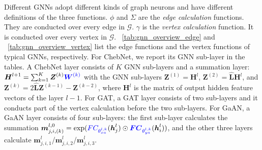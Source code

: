 Different GNNs adopt different kinds of graph neurons and have different definitions of the three functions.
$\phi$ and $\Sigma$ are the \emph{edge calculation} functions.
They are conducted over every edge in $\mathcal{G}$.
$\gamma$ is the \emph{vertex calculation} function.
It is conducted over every vertex in $\mathcal{G}$.
\tablename~\ref{tab:gnn_overview_edge} and \tablename~\ref{tab:gnn_overview_vertex} list the edge functions and the vertex functions of typical GNNs, respectively.
For ChebNet, we report its GNN sub-layer in the tables. 
A ChebNet layer consists of $K$ GNN sub-layers and a summation layer:
$\boldsymbol{H}^{l+1} = \sum_{k=1}^K{\boldsymbol{Z}^{(k)} \textcolor{blue}{\boldsymbol{W}^{(k)}}}$ with the GNN sub-layers $\boldsymbol{Z}^{(1)}=\boldsymbol{H}^l$, $\boldsymbol{Z}^{(2)}=\hat{\boldsymbol{L}}\boldsymbol{H}^l$, and $\boldsymbol{Z}^{(k)}=2\hat{\boldsymbol{L}}\boldsymbol{Z}^{(k-1)} - \boldsymbol{Z}^{(k-2)}$, where $\boldsymbol{H}^l$ is the matrix of output hidden feature vectors of the layer $l-1$.
For GAT, a GAT layer consists of two sub-layers and it conducts part of the vertex calculation before the two sub-layers.
For GaAN, a GaAN layer consists of four sub-layers: the first sub-layer calculates the summation $\boldsymbol{m}_{j, i, (k)}^{l,0}  = \exp(\textcolor{blue}{FC_{\theta^{l, k}_{xa}}} (\boldsymbol{h}_j^l) \odot \textcolor{blue}{\boldsymbol{FC}_{\theta^{l,k}_{ya}}} (\boldsymbol{h}_i^l))$, and the other three layers calculate $\boldsymbol{m}^l_{j,i,1}$/$\boldsymbol{m}^l_{j,i,2}$/$\boldsymbol{m}^l_{j,i,3}$.

